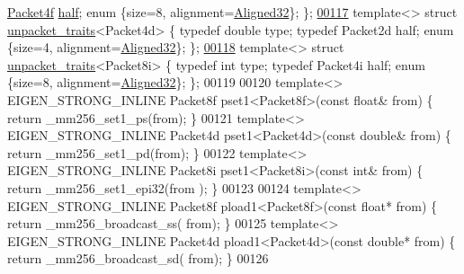 \begin{DoxyCode}
      \hyperlink{struct_eigen_1_1internal_1_1_packet4f}{Packet4f} \hyperlink{struct_eigen_1_1internal_1_1_packet4f}{half}; \textcolor{keyword}{enum} \{size=8, alignment=\hyperlink{group__enums_gga45fe06e29902b7a2773de05ba27b47a1a7797d247b86f6e9837cc338beb6060de}{Aligned32}\}; \};
\hyperlink{struct_eigen_1_1internal_1_1unpacket__traits_3_01_packet4d_01_4}{00117} \textcolor{keyword}{template}<> \textcolor{keyword}{struct }\hyperlink{struct_eigen_1_1internal_1_1unpacket__traits}{unpacket\_traits}<Packet4d> \{ \textcolor{keyword}{typedef} \textcolor{keywordtype}{double} type; \textcolor{keyword}{typedef} Packet2d half; \textcolor{keyword}{
      enum} \{size=4, alignment=\hyperlink{group__enums_gga45fe06e29902b7a2773de05ba27b47a1a7797d247b86f6e9837cc338beb6060de}{Aligned32}\}; \};
\hyperlink{struct_eigen_1_1internal_1_1unpacket__traits_3_01_packet8i_01_4}{00118} \textcolor{keyword}{template}<> \textcolor{keyword}{struct }\hyperlink{struct_eigen_1_1internal_1_1unpacket__traits}{unpacket\_traits}<Packet8i> \{ \textcolor{keyword}{typedef} \textcolor{keywordtype}{int}    type; \textcolor{keyword}{typedef} Packet4i half; \textcolor{keyword}{
      enum} \{size=8, alignment=\hyperlink{group__enums_gga45fe06e29902b7a2773de05ba27b47a1a7797d247b86f6e9837cc338beb6060de}{Aligned32}\}; \};
00119 
00120 \textcolor{keyword}{template}<> EIGEN\_STRONG\_INLINE Packet8f pset1<Packet8f>(\textcolor{keyword}{const} \textcolor{keywordtype}{float}&  from) \{ \textcolor{keywordflow}{return} \_mm256\_set1\_ps(from); 
      \}
00121 \textcolor{keyword}{template}<> EIGEN\_STRONG\_INLINE Packet4d pset1<Packet4d>(\textcolor{keyword}{const} \textcolor{keywordtype}{double}& from) \{ \textcolor{keywordflow}{return} \_mm256\_set1\_pd(from); 
      \}
00122 \textcolor{keyword}{template}<> EIGEN\_STRONG\_INLINE Packet8i pset1<Packet8i>(\textcolor{keyword}{const} \textcolor{keywordtype}{int}&    from) \{ \textcolor{keywordflow}{return} \_mm256\_set1\_epi32(from
      ); \}
00123 
00124 \textcolor{keyword}{template}<> EIGEN\_STRONG\_INLINE Packet8f pload1<Packet8f>(\textcolor{keyword}{const} \textcolor{keywordtype}{float}*  from) \{ \textcolor{keywordflow}{return} \_mm256\_broadcast\_ss(
      from); \}
00125 \textcolor{keyword}{template}<> EIGEN\_STRONG\_INLINE Packet4d pload1<Packet4d>(\textcolor{keyword}{const} \textcolor{keywordtype}{double}* from) \{ \textcolor{keywordflow}{return} \_mm256\_broadcast\_sd(
      from); \}
00126 

\end{DoxyCode}
